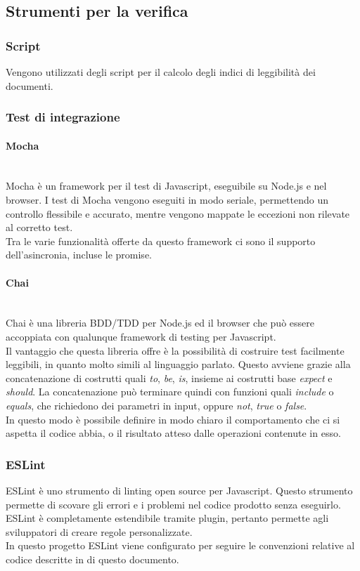\subsection{Strumenti per la verifica}
\subsubsection{Script}
Vengono utilizzati degli script per il calcolo degli indici di leggibilità dei documenti.

\subsubsection{Test di integrazione}
\paragraph{Mocha}\mbox{}\\
Mocha è un framework per il test di Javascript, eseguibile su Node.js e nel browser. I test di Mocha vengono eseguiti in modo seriale, permettendo un controllo flessibile e accurato, mentre vengono mappate le eccezioni non rilevate al corretto test.\\
Tra le varie funzionalità offerte da questo framework ci sono il supporto dell'asincronia, incluse le promise.

\paragraph{Chai}\mbox{}\\
Chai è una libreria BDD/TDD per Node.js ed il browser che può essere accoppiata con qualunque framework di testing per Javascript.\\
Il vantaggio che questa libreria offre è la possibilità di costruire test facilmente leggibili, in quanto molto simili al linguaggio parlato. Questo avviene grazie alla concatenazione di costrutti quali \textit{to}, \textit{be}, \textit{is}, insieme ai costrutti base \textit{expect} e \textit{should}. La concatenazione può terminare quindi con funzioni quali \textit{include} o \textit{equals}, che richiedono dei parametri in input, oppure \textit{not}, \textit{true} o \textit{false}.\\
In questo modo è possibile definire in modo chiaro il comportamento che ci si aspetta il codice abbia, o il risultato atteso dalle operazioni contenute in esso.

\subsubsection{ESLint} \label{sec:eslint}
ESLint è uno strumento di linting open source per Javascript. Questo strumento permette di scovare gli errori e i problemi nel codice prodotto senza eseguirlo.\\ ESLint è completamente estendibile tramite plugin, pertanto permette agli sviluppatori di creare regole personalizzate.\\
In questo progetto ESLint viene configurato per seguire le convenzioni relative al codice descritte in  di questo documento.